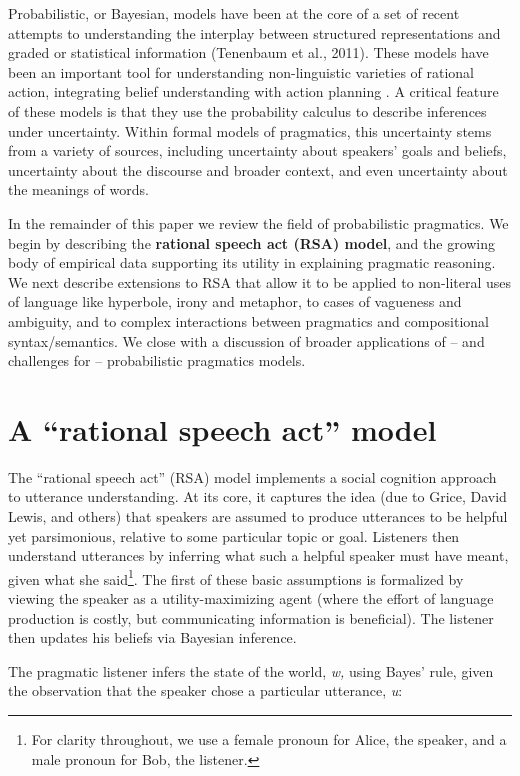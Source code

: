 \documentclass[]{elsarticle}
\begin{document}
Probabilistic, or Bayesian, models have been at the core of a set of
recent attempts to understanding the interplay between structured
representations and graded or statistical information (Tenenbaum et al.,
2011). These models have been an important tool for understanding
non-linguistic varieties of rational action, integrating belief
understanding with action planning \citep{baker2009}. A
critical feature of these models is that they use the probability
calculus to describe inferences under uncertainty. Within formal models
of pragmatics, this uncertainty stems from a variety of sources,
including uncertainty about speakers' goals and beliefs, uncertainty
about the discourse and broader context, and even uncertainty about the
meanings of words.

In the remainder of this paper we review the field of probabilistic
pragmatics. We begin by describing the \textbf{rational speech act
(RSA) model}, and the growing body of empirical data supporting its
utility in explaining pragmatic reasoning. We next describe extensions
to RSA that allow it to be applied to non-literal uses of language like
hyperbole, irony and metaphor, to cases of vagueness and ambiguity, and
to complex interactions between pragmatics and compositional
syntax/semantics. We close with a discussion of broader applications of
-- and challenges for -- probabilistic pragmatics models.

\section{A ``rational speech act'' model}\label{a-rational-speech-act-model}

The ``rational speech act'' (RSA) model implements a social
cognition approach to utterance understanding. At its core, it captures
the idea (due to Grice, David Lewis, and others) that speakers are assumed to
produce utterances to be helpful yet parsimonious, relative to some
particular topic or goal. Listeners then understand utterances by
inferring what such a helpful speaker must have meant, given what she
said\footnote{For clarity throughout, we use a female pronoun for Alice, the speaker, and a male pronoun for Bob, the listener.}. 
The first of these basic assumptions is formalized by viewing the speaker
as a utility-maximizing agent (where the effort of language production
is costly, but communicating information is beneficial). The listener then
updates his beliefs via Bayesian inference.

The pragmatic listener infers the state of the world, \emph{w,} using
Bayes' rule, given the observation that the speaker chose a particular
utterance, \emph{u}:
\end{document}
